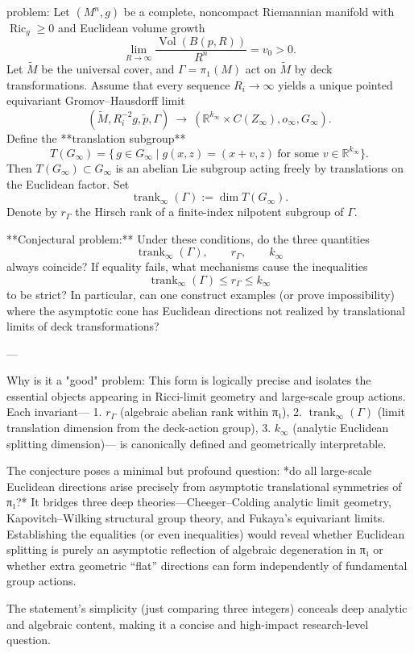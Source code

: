 problem:  
Let \((M^n,g)\) be a complete, noncompact Riemannian manifold with \(\operatorname{Ric}_g \ge 0\) and Euclidean volume growth  
\[
\lim_{R\to\infty}\frac{\operatorname{Vol}(B(p,R))}{R^n}=v_0>0.
\]
Let \(\widetilde M\) be the universal cover, and \(\Gamma=\pi_1(M)\) act on \(\widetilde M\) by deck transformations.  
Assume that every sequence \(R_i\to\infty\) yields a unique pointed equivariant Gromov–Hausdorff limit
\[
(\widetilde M,R_i^{-2}g,\tilde p,\Gamma)\ \longrightarrow\ (\mathbb{R}^{k_\infty}\!\times\! C(Z_\infty),o_\infty,G_\infty).
\]
Define the **translation subgroup**
\[
T(G_\infty)=\bigl\{\,g\in G_\infty \mid g(x,z)=(x+v,z)\ \text{for some }v\in\mathbb{R}^{k_\infty}\bigr\}.
\]
Then \(T(G_\infty)\subset G_\infty\) is an abelian Lie subgroup acting freely by translations on the Euclidean factor.  
Set
\[
\operatorname{trank}_\infty(\Gamma):=\dim T(G_\infty).
\]
Denote by \(r_\Gamma\) the Hirsch rank of a finite-index nilpotent subgroup of \(\Gamma\).

**Conjectural problem:**  
Under these conditions, do the three quantities
\[
\operatorname{trank}_\infty(\Gamma),\qquad r_\Gamma,\qquad k_\infty
\]
always coincide?  If equality fails, what mechanisms cause the inequalities
\[
\operatorname{trank}_\infty(\Gamma)\le r_\Gamma\le k_\infty
\]
to be strict?  In particular, can one construct examples (or prove impossibility) where the asymptotic cone has Euclidean directions not realized by translational limits of deck transformations?

---

Why is it a "good" problem:  
This form is logically precise and isolates the essential objects appearing in Ricci-limit geometry and large-scale group actions.  Each invariant—
1. \(r_\Gamma\) (algebraic abelian rank within π₁),  
2. \(\operatorname{trank}_\infty(\Gamma)\) (limit translation dimension from the deck-action group),  
3. \(k_\infty\) (analytic Euclidean splitting dimension)—  
is canonically defined and geometrically interpretable.

The conjecture poses a minimal but profound question: *do all large-scale Euclidean directions arise precisely from asymptotic translational symmetries of π₁?*  
It bridges three deep theories—Cheeger–Colding analytic limit geometry, Kapovitch–Wilking structural group theory, and Fukaya’s equivariant limits. Establishing the equalities (or even inequalities) would reveal whether Euclidean splitting is purely an asymptotic reflection of algebraic degeneration in π₁ or whether extra geometric “flat” directions can form independently of fundamental group actions.  

The statement’s simplicity (just comparing three integers) conceals deep analytic and algebraic content, making it a concise and high-impact research-level question.
